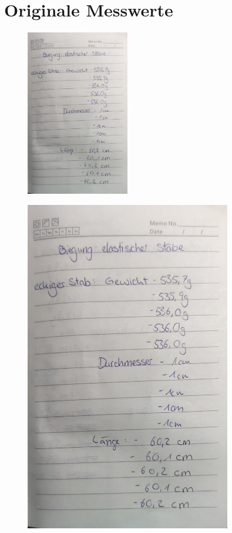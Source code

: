 \section{Originale Messwerte}
\begin{figure}
    \includegraphics[page=1, width=4.5cm]{Bilder/Messwerte.pdf}
\end{figure}
\begin{figure}
    \includegraphics[page=2, width=9cm]{Bilder/Messwerte.pdf}
\end{figure}
